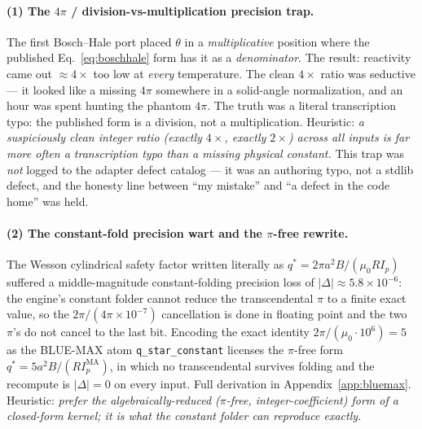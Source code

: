 \paragraph{(1) The $4\pi$ / division-vs-multiplication precision trap.}
The first Bosch--Hale port placed $\theta$ in a \emph{multiplicative}
position where the published Eq.~\eqref{eq:boschhale} form has it as a
\emph{denominator}. The result: reactivity came out $\approx4\times$ too
low at \emph{every} temperature. The clean $4\times$ ratio was
seductive --- it looked like a missing $4\pi$ somewhere in a
solid-angle normalization, and an hour was spent hunting the phantom
$4\pi$. The truth was a literal transcription typo: the published form
is a division, not a multiplication. Heuristic: \emph{a suspiciously
clean integer ratio (exactly $4\times$, exactly $2\times$) across all
inputs is far more often a transcription typo than a missing physical
constant.} This trap was \emph{not} logged to the adapter defect catalog
--- it was an authoring typo, not a stdlib defect, and the honesty line
between ``my mistake'' and ``a defect in the code home'' was held.

\paragraph{(2) The constant-fold precision wart and the $\pi$-free rewrite.}
The Wesson cylindrical safety factor written literally as
$q^{*} = 2\pi a^2 B / (\mu_0 R I_p)$ suffered a middle-magnitude
constant-folding precision loss of $|\Delta|\approx5.8\times10^{-6}$:
the engine's constant folder cannot reduce the transcendental $\pi$ to a
finite exact value, so the $2\pi/(4\pi\times10^{-7})$ cancellation is
done in floating point and the two $\pi$'s do not cancel to the last
bit. Encoding the exact identity $2\pi/(\mu_0\!\cdot\!10^{6})=5$ as the
BLUE-MAX atom \verb|q_star_constant| licenses the $\pi$-free form
$q^{*} = 5 a^2 B / (R I_p^{\text{MA}})$, in which no transcendental
survives folding and the recompute is $|\Delta|=0$ on every input. Full
derivation in Appendix~\ref{app:bluemax}. Heuristic: \emph{prefer the
algebraically-reduced ($\pi$-free, integer-coefficient) form of a
closed-form kernel; it is what the constant folder can reproduce
exactly.}

